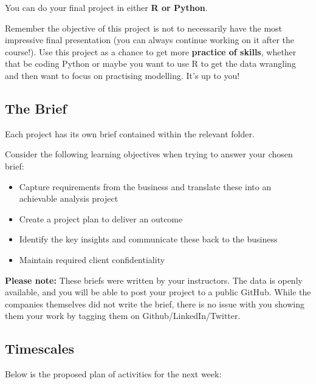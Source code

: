 \documentclass[
]{article}
\providecommand{\tightlist}{%
  \setlength{\itemsep}{0pt}\setlength{\parskip}{0pt}}
\begin{document}
You can do your final project in either \textbf{R or Python}.

Remember the objective of this project is not to necessarily have the
most impressive final presentation (you can always continue working on
it after the course!). Use this project as a chance to get more
\textbf{practice of skills}, whether that be coding Python or maybe you
want to use R to get the data wrangling and then want to focus on
practising modelling. It's up to you!

\hypertarget{the-brief}{%
\subsection{The Brief}\label{the-brief}}

Each project has its own brief contained within the relevant folder.

Consider the following learning objectives when trying to answer your
chosen brief:

\begin{itemize}
\tightlist
\item
  Capture requirements from the business and translate these into an
  achievable analysis project
\item
  Create a project plan to deliver an outcome
\item
  Identify the key insights and communicate these back to the business
\item
  Maintain required client confidentiality
\end{itemize}

\textbf{Please note:} These briefs were written by your instructors. The
data is openly available, and you will be able to post your project to a
public GitHub. While the companies themselves did not write the brief,
there is no issue with you showing them your work by tagging them on
Github/LinkedIn/Twitter.

\hypertarget{timescales}{%
\subsection{Timescales}\label{timescales}}

Below is the proposed plan of activities for the next week:
\end{document}
